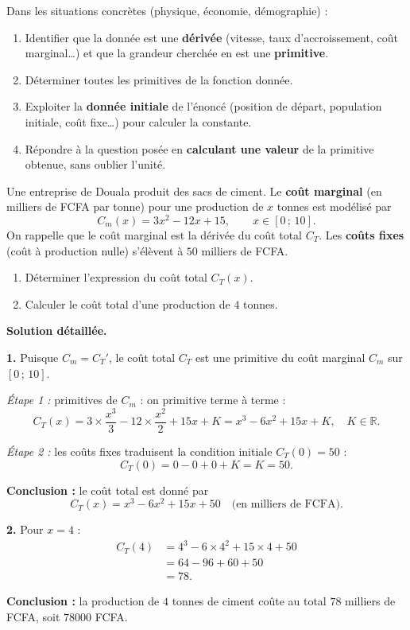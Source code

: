 \documentclass[11pt]{article}
\newcounter{popsec}
\newcounter{popsub}
\newcommand{\courssub}[1]{%
  \stepcounter{popsub}%
  \par\vspace{9pt}\noindent{\popxbold\fontsize{11.5}{13}\selectfont\color{popink}{\color{poporange}\thepopsec.\thepopsub}\hspace{6pt}#1}\par\nopagebreak\vspace{4pt}
}
\begin{document}
\courssub{Applications et synthèse}

\begin{methode}
Dans les situations concrètes (physique, économie, démographie) :
\begin{enumerate}
\item Identifier que la donnée est une \textbf{dérivée} (vitesse, taux d'accroissement, coût marginal\dots) et que la grandeur cherchée en est une \textbf{primitive}.
\item Déterminer toutes les primitives de la fonction donnée.
\item Exploiter la \textbf{donnée initiale} de l'énoncé (position de départ, population initiale, coût fixe\dots) pour calculer la constante.
\item Répondre à la question posée en \textbf{calculant une valeur} de la primitive obtenue, sans oublier l'unité.
\end{enumerate}
\end{methode}

\begin{exoresolu}
Une entreprise de Douala produit des sacs de ciment. Le \textbf{coût marginal} (en milliers de FCFA par tonne) pour une production de $x$ tonnes est modélisé par
\[ C_m(x) = 3x^2 - 12x + 15, \qquad x \in [0\,;\,10]. \]
On rappelle que le coût marginal est la dérivée du coût total $C_T$. Les \textbf{coûts fixes} (coût à production nulle) s'élèvent à $50$ milliers de FCFA.
\begin{enumerate}
\item Déterminer l'expression du coût total $C_T(x)$.
\item Calculer le coût total d'une production de $4$ tonnes.
\end{enumerate}
\tcblower
\textbf{Solution détaillée.}

\textbf{1.} Puisque $C_m = C_T'$, le coût total $C_T$ est une primitive du coût marginal $C_m$ sur $[0\,;\,10]$.

\emph{Étape 1 :} primitives de $C_m$ : on primitive terme à terme :
\[ C_T(x) = 3\times\frac{x^3}{3} - 12\times\frac{x^2}{2} + 15x + K = x^3 - 6x^2 + 15x + K, \quad K\in\mathbb{R}. \]

\emph{Étape 2 :} les coûts fixes traduisent la condition initiale $C_T(0) = 50$ :
\[ C_T(0) = 0 - 0 + 0 + K = K = 50. \]

\textbf{Conclusion :} le coût total est donné par
\[ C_T(x) = x^3 - 6x^2 + 15x + 50 \quad \text{(en milliers de FCFA)}. \]

\textbf{2.} Pour $x = 4$ :
\begin{align*}
C_T(4) &= 4^3 - 6\times 4^2 + 15\times 4 + 50 \\
&= 64 - 96 + 60 + 50 \\
&= 78.
\end{align*}

\textbf{Conclusion :} la production de $4$ tonnes de ciment coûte au total $78$ milliers de FCFA, soit $\num{78000}$ FCFA.
\end{exoresolu}
\end{document}
